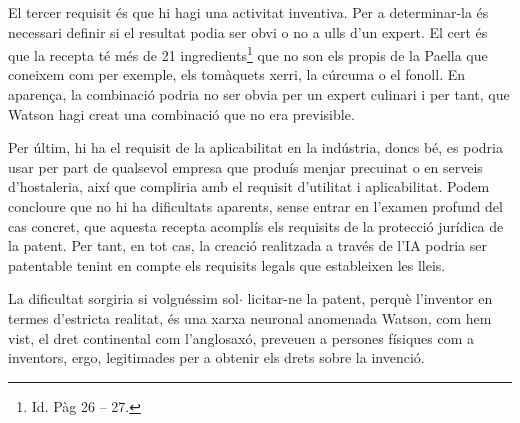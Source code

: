 \documentclass[12pt]{article}
\begin{document}
\vspace{\baselineskip}
\begin{justify}
El tercer requisit és que hi hagi una activitat inventiva. Per a determinar-la és necessari definir si el resultat podia ser obvi o no a ulls d’un expert. El cert és que la recepta té més de 21 ingredients\footnote{ Id. Pàg 26 – 27. } que no son els propis de la Paella que coneixem com per exemple, els tomàquets xerri, la cúrcuma o el fonoll. En aparença, la combinació podria no ser obvia per un expert culinari i per tant, que Watson hagi creat una combinació que no era previsible.
\end{justify}\par


\vspace{\baselineskip}
\begin{justify}
Per últim, hi ha el requisit de la aplicabilitat en la indústria, doncs bé, es podria usar per part de qualsevol empresa que produís menjar precuinat o en serveis d’hostaleria, així que compliria amb el requisit d’utilitat i aplicabilitat.  Podem concloure que no hi ha dificultats aparents, sense entrar en l’examen profund del cas concret, que aquesta recepta acomplís els requisits de la protecció jurídica de la patent. Per tant, en tot cas, la creació realitzada a través de l’IA podria ser patentable tenint en compte els requisits legals que estableixen les lleis.
\end{justify}\par


\vspace{\baselineskip}
\begin{justify}
La dificultat sorgiria si volguéssim sol$ \cdot $ licitar-ne la patent, perquè l’inventor en termes d’estricta realitat, és una xarxa neuronal anomenada Watson, com hem vist, el dret continental com l’anglosaxó, preveuen a persones físiques com a inventors, ergo, legitimades per a obtenir els drets sobre la invenció. 
\end{justify}\par
\end{document}
